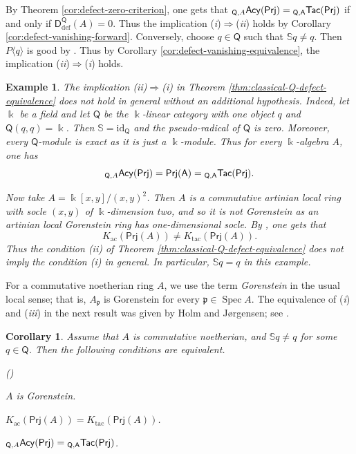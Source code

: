 \documentclass{amsart}
\theoremstyle{bfupright head,slanted body}
\theoremstyle{bfupright head,upright body}
\theoremstyle{fixed bf head,slanted body}
\newtheorem{cor}[res]{Corollary}        \newtheorem*{cor*}{Corollary}
\theoremstyle{fixed bf head,upright body}
\newtheorem{exa}[res]{Example}           \newtheorem*{exa*}{Example}
\theoremstyle{numbered paragraph}
\newlength{\thmlistleft}        %
\newlength{\thmlistright}       %
\newlength{\thmlistpartopsep}   %
\newlength{\thmlisttopsep}      %
\newlength{\thmlistparsep}      %
\newlength{\thmlistitemsep}     %
\newcounter{eqc}
\newenvironment{eqc}{\begin{list}{\upshape (\textit{\roman{eqc}})}%
		{\usecounter{eqc}%
			\setlength{\leftmargin}{\thmlistleft}%
			\setlength{\labelwidth}{\thmlistleft}%
			\setlength{\rightmargin}{\thmlistright}%
			\setlength{\partopsep}{\thmlistpartopsep}%
			\setlength{\topsep}{\thmlisttopsep}%
			\setlength{\parsep}{\thmlistparsep}%
			\setlength{\itemsep}{\thmlistitemsep}}}%
	{\end{list}}%
\newenvironment{prf*}[1][Proof]{%
	\begin{proof}[\bf #1]
		\setcounter{equation}{0}
		\renewcommand{\theequation}{\arabic{equation}}}
	{\end{proof}
}
\newcommand{\eqclbl}[1]{{\upshape(\textit{#1})}}
\numberwithin{equation}{res}
\newcommand{\TacQ}{{}_{\Q,A}\mathsf{Tac}(\sf Prj)}
\newcommand{\AcQ}{{}_{\Q,A}\mathsf{Acy}(\sf Prj)}
\newcommand{\Prj}[1]{\mathsf{Prj}(#1)}
\newcommand{\Q}{\mathsf{Q}}
\newcommand{\id}{\mathrm{id}}
\newcommand{\kk}{\Bbbk}
\begin{document}
\begin{prf*}
By Theorem \ref{cor:defect-zero-criterion}, one gets that $\AcQ=\TacQ$ if and only if $\mathsf D_{\mathrm{def}}^{\Q}(A)=0$. Thus the implication \eqclbl{i}$\Longrightarrow$\eqclbl{ii} holds by Corollary \ref{cor:defect-vanishing-forward}. Conversely, choose $q\in\Q$ such that $\mathbb S q\neq q$. Then $P\langle q\rangle$ is good by \cite[Lemma 2.7$(iii)$]{HJ26}. Thus by Corollary \ref{cor:defect-vanishing-equivalence}, the implication \eqclbl{ii}$\Longrightarrow$\eqclbl{i} holds.
\end{prf*}

\begin{exa}\label{exa:converse-fails}
The implication \eqclbl{ii}$\Longrightarrow$\eqclbl{i} in Theorem \ref{thm:classical-Q-defect-equivalence} does not hold in general without an additional hypothesis. Indeed, let $\kk$ be a field and let $\Q$ be the $\kk$-linear category with one object $q$ and $\Q(q,q)=\kk$. Then $\mathbb S=\id_{\Q}$ and the pseudo-radical of $\Q$ is zero. Moreover, every $\Q$-module is exact as it is just a $\kk$-module. Thus for every $\kk$-algebra $A$, one has
$$\AcQ=\Prj A=\TacQ.$$

Now take $A=\kk[x,y]/(x,y)^2$. Then $A$ is a commutative artinian local ring with socle $(x,y)$ of $\kk$-dimension two, and so it is not Gorenstein as an artinian local Gorenstein ring has one-dimensional socle. By \cite[Theorem 19.5.25]{CFH24}, one gets that
$$K_{\mathrm{ac}}(\Prj A)\neq K_{\mathrm{tac}}(\Prj A).$$
Thus the condition \eqclbl{ii} of Theorem \ref{thm:classical-Q-defect-equivalence} does not imply the condition \eqclbl{i} in general. In particular, $\mathbb S q=q$ in this example.
\end{exa}

For a commutative noetherian ring $A$, we use the term \emph{Gorenstein} in the usual local sense; that is, $A_{\mathfrak p}$ is Gorenstein for every $\mathfrak p\in\operatorname{Spec}A$. The equivalence of \eqclbl{i} and \eqclbl{iii} in the next result was given by Holm and J{\o}rgensen; see \cite[Theorem B]{HJ26}.

\begin{cor}\label{cor:Gorenstein-Q-defect}
Assume that $A$ is commutative noetherian, and $\mathbb S q\neq q$ for some $q\in\Q$. Then the following conditions are equivalent.
\begin{eqc}
\item $A$ is Gorenstein.
\item $K_{\mathrm{ac}}(\Prj A)=K_{\mathrm{tac}}(\Prj A)$.
\item $\AcQ=\TacQ$.
\end{eqc}
\end{cor}
\end{document}
